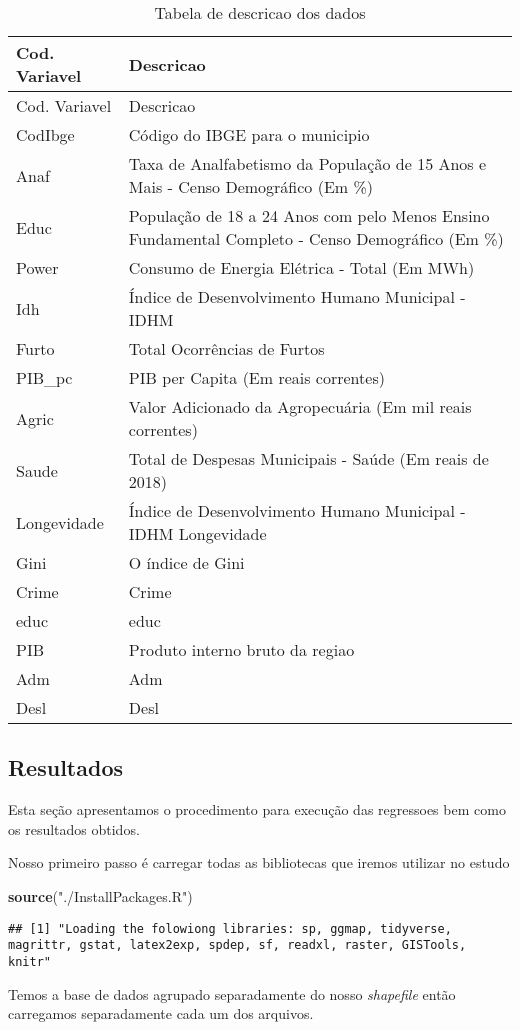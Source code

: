 \documentclass[]{article}
\newenvironment{Shaded}{\begin{snugshade}}{\end{snugshade}}
\newcommand{\KeywordTok}[1]{\textcolor[rgb]{0.13,0.29,0.53}{\textbf{#1}}}
\newcommand{\StringTok}[1]{\textcolor[rgb]{0.31,0.60,0.02}{#1}}
\newcommand{\NormalTok}[1]{#1}
\begin{document}
\begin{longtable}[]{@{}ll@{}}
\caption{Tabela de descricao dos dados}\tabularnewline
\toprule
Cod. Variavel & Descricao\tabularnewline
\midrule
\endfirsthead
\toprule
Cod. Variavel & Descricao\tabularnewline
\midrule
\endhead
CodIbge & Código do IBGE para o municipio\tabularnewline
Anaf & Taxa de Analfabetismo da População de 15 Anos e Mais - Censo
Demográfico (Em \%)\tabularnewline
Educ & População de 18 a 24 Anos com pelo Menos Ensino Fundamental
Completo - Censo Demográfico (Em \%)\tabularnewline
Power & Consumo de Energia Elétrica - Total (Em MWh)\tabularnewline
Idh & Índice de Desenvolvimento Humano Municipal - IDHM\tabularnewline
Furto & Total Ocorrências de Furtos\tabularnewline
PIB\_pc & PIB per Capita (Em reais correntes)\tabularnewline
Agric & Valor Adicionado da Agropecuária (Em mil reais
correntes)\tabularnewline
Saude & Total de Despesas Municipais - Saúde (Em reais de
2018)\tabularnewline
Longevidade & Índice de Desenvolvimento Humano Municipal - IDHM
Longevidade\tabularnewline
Gini & O índice de Gini\tabularnewline
Crime & Crime\tabularnewline
educ & educ\tabularnewline
PIB & Produto interno bruto da regiao\tabularnewline
Adm & Adm\tabularnewline
Desl & Desl\tabularnewline
\bottomrule
\end{longtable}

\subsection{Resultados}\label{resultados}

Esta seção apresentamos o procedimento para execução das regressoes bem
como os resultados obtidos.

Nosso primeiro passo é carregar todas as bibliotecas que iremos utilizar
no estudo

\begin{Shaded}
\begin{Highlighting}[]
\KeywordTok{source}\NormalTok{(}\StringTok{"./InstallPackages.R"}\NormalTok{)}
\end{Highlighting}
\end{Shaded}

\begin{verbatim}
## [1] "Loading the folowiong libraries: sp, ggmap, tidyverse, magrittr, gstat, latex2exp, spdep, sf, readxl, raster, GISTools, knitr"
\end{verbatim}

Temos a base de dados agrupado separadamente do nosso \emph{shapefile}
então carregamos separadamente cada um dos arquivos.
\end{document}
